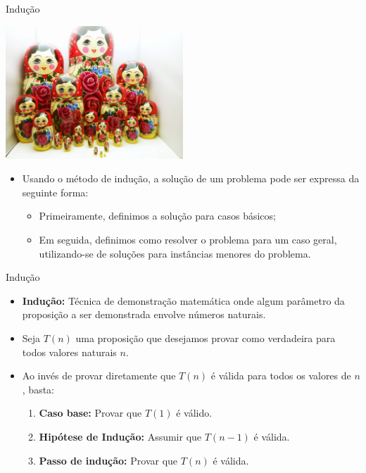 \documentclass[handout]{beamer}
\begin{document}
\begin{frame}[fragile]{Indução}

    \begin{center}
        \includegraphics[width=0.5\textwidth]{figs/matrioska}
    \end{center}

    \begin{itemize}[<+->]
        \item Usando o método de indução, a solução de um problema pode ser expressa da seguinte forma:
        \begin{itemize}
            \item Primeiramente, definimos a solução para casos básicos;
            \item Em seguida, definimos como resolver o problema para um caso geral, utilizando-se de soluções para instâncias menores do problema.
        \end{itemize}
    \end{itemize}
\end{frame}

\begin{frame}[fragile]{Indução}

    \begin{itemize}[<+->]
        \item {\bf Indução:} Técnica de demonstração matemática onde algum parâmetro da proposição a ser demonstrada envolve números naturais.
        \item Seja $T(n)$ uma proposição que desejamos provar como verdadeira para todos valores naturais $n$.
        \item Ao invés de provar diretamente que $T(n)$ é válida para todos os valores de $n$, basta:
        \begin{enumerate}
            \item {\bf Caso base:} Provar que $T(1)$ é válido.
            \item {\bf Hipótese de Indução:} Assumir que $T(n-1)$ é válida.
            \item {\bf Passo de indução:} Provar que $T(n)$ é válida.
        \end{enumerate}
    \end{itemize}
\end{frame}
\end{document}
